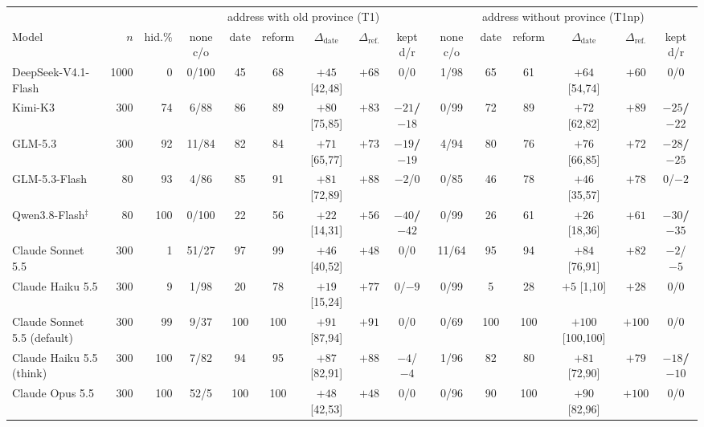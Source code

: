 \begin{tabular}{@{}l r r ccc cc c ccc cc c@{}}
\toprule
 & & & \multicolumn{6}{c}{address with old province (T1)} & \multicolumn{6}{c}{address without province (T1np)} \\
\cmidrule(lr){4-9}\cmidrule(lr){10-15}
Model & $n$ & hid.\% & none c/o & date & reform & $\Delta_{\text{date}}$ & $\Delta_{\text{ref.}}$ & kept d/r & none c/o & date & reform & $\Delta_{\text{date}}$ & $\Delta_{\text{ref.}}$ & kept d/r \\
\midrule
DeepSeek-V4.1-Flash & 1000 & 0 & 0/100 & 45 & 68 & $+45$ {\scriptsize[42,48]} & $+68$ & $0$/$0$ & 1/98 & 65 & 61 & $+64$ {\scriptsize[54,74]} & $+60$ & $0$/$0$ \\
Kimi-K3 & 300 & 74 & 6/88 & 86 & 89 & $+80$ {\scriptsize[75,85]} & $+83$ & \textbf{$-21$/$-18$} & 0/99 & 72 & 89 & $+72$ {\scriptsize[62,82]} & $+89$ & \textbf{$-25$/$-22$} \\
GLM-5.3 & 300 & 92 & 11/84 & 82 & 84 & $+71$ {\scriptsize[65,77]} & $+73$ & \textbf{$-19$/$-19$} & 4/94 & 80 & 76 & $+76$ {\scriptsize[66,85]} & $+72$ & \textbf{$-28$/$-25$} \\
GLM-5.3-Flash & 80 & 93 & 4/86 & 85 & 91 & $+81$ {\scriptsize[72,89]} & $+88$ & $-2$/$0$ & 0/85 & 46 & 78 & $+46$ {\scriptsize[35,57]} & $+78$ & $0$/$-2$ \\
Qwen3.8-Flash$^\ddagger$ & 80 & 100 & 0/100 & 22 & 56 & $+22$ {\scriptsize[14,31]} & $+56$ & \textbf{$-40$/$-42$} & 0/99 & 26 & 61 & $+26$ {\scriptsize[18,36]} & $+61$ & \textbf{$-30$/$-35$} \\
Claude Sonnet 5.5 & 300 & 1 & 51/27 & 97 & 99 & $+46$ {\scriptsize[40,52]} & $+48$ & $0$/$0$ & 11/64 & 95 & 94 & $+84$ {\scriptsize[76,91]} & $+82$ & $-2$/$-5$ \\
Claude Haiku 5.5 & 300 & 9 & 1/98 & 20 & 78 & $+19$ {\scriptsize[15,24]} & $+77$ & $0$/$-9$ & 0/99 & 5 & 28 & $+5$ {\scriptsize[1,10]} & $+28$ & $0$/$0$ \\
Claude Sonnet 5.5 (default) & 300 & 99 & 9/37 & 100 & 100 & $+91$ {\scriptsize[87,94]} & $+91$ & $0$/$0$ & 0/69 & 100 & 100 & $+100$ {\scriptsize[100,100]} & $+100$ & $0$/$0$ \\
Claude Haiku 5.5 (think) & 300 & 100 & 7/82 & 94 & 95 & $+87$ {\scriptsize[82,91]} & $+88$ & $-4$/$-4$ & 1/96 & 82 & 80 & $+81$ {\scriptsize[72,90]} & $+79$ & \textbf{$-18$/$-10$} \\
Claude Opus 5.5 & 300 & 100 & 52/5 & 100 & 100 & $+48$ {\scriptsize[42,53]} & $+48$ & $0$/$0$ & 0/96 & 90 & 100 & $+90$ {\scriptsize[82,96]} & $+100$ & $0$/$0$ \\

\end{tabular}
